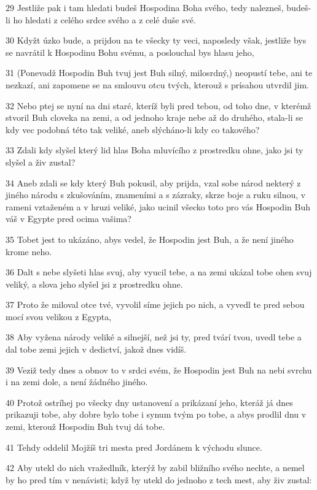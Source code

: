 \par 29 Jestliže pak i tam hledati budeš Hospodina Boha svého, tedy nalezneš, budeš-li ho hledati z celého srdce svého a z celé duše své.
\par 30 Kdyžt úzko bude, a prijdou na te všecky ty veci, naposledy však, jestliže bys se navrátil k Hospodinu Bohu svému, a poslouchal bys hlasu jeho,
\par 31 (Ponevadž Hospodin Buh tvuj jest Buh silný, milosrdný,) neopustí tebe, ani te nezkazí, ani zapomene se na smlouvu otcu tvých, kterouž s prísahou utvrdil jim.
\par 32 Nebo ptej se nyní na dni staré, kteríž byli pred tebou, od toho dne, v kterémž stvoril Buh cloveka na zemi, a od jednoho kraje nebe až do druhého, stala-li se kdy vec podobná této tak veliké, aneb slýcháno-li kdy co takového?
\par 33 Zdali kdy slyšel který lid hlas Boha mluvícího z prostredku ohne, jako jsi ty slyšel a živ zustal?
\par 34 Aneb zdali se kdy který Buh pokusil, aby prijda, vzal sobe národ nekterý z jiného národu s zkušováním, znameními a s zázraky, skrze boje a ruku silnou, v rameni vztaženém a v hruzi veliké, jako ucinil všecko toto pro vás Hospodin Buh váš v Egypte pred ocima vašima?
\par 35 Tobet jest to ukázáno, abys vedel, že Hospodin jest Buh, a že není jiného krome neho.
\par 36 Dalt s nebe slyšeti hlas svuj, aby vyucil tebe, a na zemi ukázal tobe ohen svuj veliký, a slova jeho slyšel jsi z prostredku ohne.
\par 37 Proto že miloval otce tvé, vyvolil síme jejich po nich, a vyvedl te pred sebou mocí svou velikou z Egypta,
\par 38 Aby vyžena národy veliké a silnejší, než jsi ty, pred tvárí tvou, uvedl tebe a dal tobe zemi jejich v dedictví, jakož dnes vidíš.
\par 39 Veziž tedy dnes a obnov to v srdci svém, že Hospodin jest Buh na nebi svrchu i na zemi dole, a není žádného jiného.
\par 40 Protož ostríhej po všecky dny ustanovení a prikázaní jeho, kteráž já dnes prikazuji tobe, aby dobre bylo tobe i synum tvým po tobe, a abys prodlil dnu v zemi, kterouž Hospodin Buh tvuj dá tobe.
\par 41 Tehdy oddelil Mojžíš tri mesta pred Jordánem k východu slunce.
\par 42 Aby utekl do nich vražedlník, kterýž by zabil bližního svého nechte, a nemel by ho pred tím v nenávisti; když by utekl do jednoho z tech mest, aby živ zustal:
